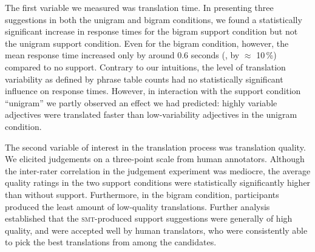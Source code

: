 \documentclass[output=paper]{LSP/langsci}
\begin{document}
The first variable we measured was translation time. In presenting
three suggestions in both the unigram and bigram conditions, we found
a statistically significant increase in response times for the bigram
support condition but not the unigram support condition. Even for the
bigram condition, however, the mean response time increased only by
around 0.6 seconds (\ie, by $\approx$ 10\,\%) compared to no
support. Contrary to our intuitions, the level of translation
variability as defined by phrase table counts had no statistically
significant influence on response times. However, in interaction with
the support condition ``unigram'' we partly observed an effect we had
predicted: highly variable adjectives were translated faster than
low-variability adjectives in the unigram condition.

The second variable of interest in the translation process was
translation quality. We elicited judgements on a three-point scale from
human annotators.
Although the inter-rater correlation in the judgement experiment was
 mediocre,
the average quality ratings in the two support conditions were
statistically significantly higher than without support. Furthermore,
in the bigram condition, participants produced the least amount of
low-quality translations. Further analysis established that the
\textsc{smt}-produced support suggestions were generally of high
quality, and were accepted well by human translators, who were
consistently able to pick the best translations from among the
candidates. 
%
\end{document}
